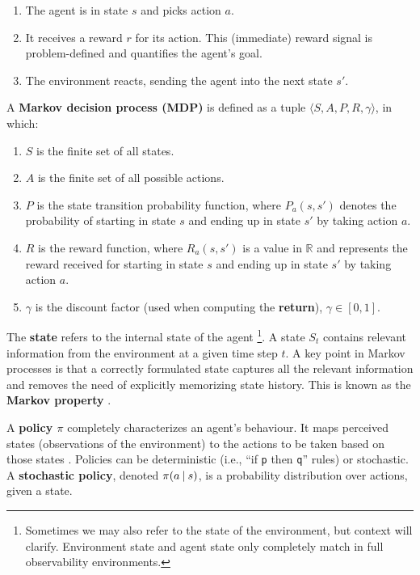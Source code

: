 \begin{enumerate}
    \item The agent is in state \(s\) and picks action \(a\).
    \item It receives a reward \(r\) for its action. This (immediate) reward signal is problem-defined and quantifies the agent’s goal.
    \item The environment reacts, sending the agent into the next state \(s'\).
\end{enumerate}

A \textbf{Markov decision process (MDP)} is defined as a tuple \(\langle S, A, P, R, \gamma \rangle\), in which:
\begin{enumerate}
    \item \(S\) is the finite set of all states.
    \item \(A\) is the finite set of all possible actions.
    \item \(P\) is the state transition probability function, where \(P_a(s, s')\) denotes the probability of starting in state \(s\) and ending up in state \(s'\) by taking action \(a\).
    \item \(R\) is the reward function, where \(R_a(s, s')\) is a value in \(\mathbb{R}\) and represents the reward received for starting in state \(s\) and ending up in state \(s'\) by taking action \(a\).
    \item \(\gamma\) is the discount factor (used when computing the \textbf{return}), \(\gamma \in [0, 1]\).
\end{enumerate}

The \textbf{state} refers to the internal state of the agent \footnote{Sometimes we may also refer to the state of the environment, but context will clarify. Environment state and agent state only completely match in full observability environments.}.
A state \(S_t\) contains relevant information from the environment at a given time step \(t\).
A key point in Markov processes is that a correctly formulated state captures all the relevant information and removes the need of explicitly memorizing state history.
This is known as the \textbf{Markov property} \cite{silver-lectures}.

A \textbf{policy \(\pi\)} completely characterizes an agent’s behaviour.
It maps perceived states (observations of the environment) to the actions to be taken based on those states \cite{rlai}.
Policies can be deterministic (i.e., ``if \verb|p| then \verb|q|'' rules) or stochastic.
A \textbf{stochastic policy}, denoted \(\pi(a \:\vert\: s)\), is a probability distribution over actions, given a state.

